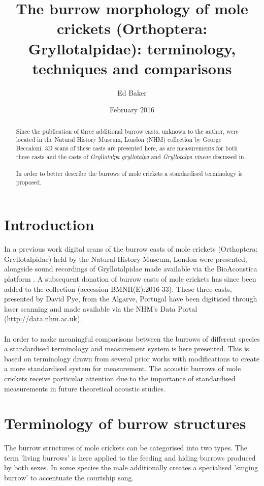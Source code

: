 \documentclass{article}
\title{The burrow morphology of mole crickets (Orthoptera: Gryllotalpidae): terminology, techniques and comparisons}
\author{Ed Baker}
\date{February 2016}
\begin{document}
   \maketitle

   \begin{abstract}
   	Since the publication of \cite{baker2016} three additional burrow casts, unknown to the author, were located in the Natural History Museum, London (NHM) collection by George Beccaloni. 3D scans of these casts are presented here, as are measurements for both these casts and the casts of \textit{Gryllotalpa gryllotalpa} and \textit{Gryllotalpa vineae} discussed in \cite{baker2016}.
   	\paragraph{}
   	In order to better describe the burrows of mole crickets a standardised terminology is proposed.
   \end{abstract}
   \tableofcontents
   \listoffigures
   \listoftables
   \section{Introduction}
   In a previous work \cite{baker2016} digital scans of the burrow casts of mole crickets (Orthoptera: Gryllotalpidae) held by the Natural History Museum, London were presented, alongside sound recordings of Gryllotalpidae made available via the BioAcoustica platform \cite{baker2015}. A subsequent donation of burrow casts of mole crickets has since been added to the collection (accession BMNH(E):2016-33). These three casts, presented by David Pye, from the Algarve, Portugal have been digitisied through laser scanning and made available via the NHM's Data Portal (http://data.nhm.ac.uk).
   \paragraph{}
   In order to make meaningful comparisons between the burrows of different species a standardised terminology and measurement system is here presented. This is based on terminology drawn from several prior works \cite{endo2007,walker1990} with modifications to create a more standardised system for measurement. The acoustic burrows of mole crickets receive particular attention due to the importance of standardised measurements in future theoretical acoustic studies.
   \section{Terminology of burrow structures}
   The burrow structures of mole crickets can be categorised into two types. The term 'living burrows' is here applied to the feeding and hiding burrows produced by both sexes. In some species the male additionally creates a specialised 'singing burrow' to accentuate the courtship song.
\end{document}
